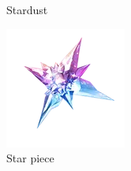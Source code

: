 \begin{figure}[h]
\begin{minipage}[t]{0.3\textwidth}
\begin{center}
    \end{center}
    \caption*{Stardust}
    \label{fig:stardust}
  \end{minipage}
  \begin{minipage}[t]{0.3\textwidth}
    \begin{center}
    \includegraphics[width=\textwidth]{images/starpiece.png}
    \end{center}
    \caption*{Star piece}
    \label{fig:starpiece}
  \end{minipage}
\end{figure}

